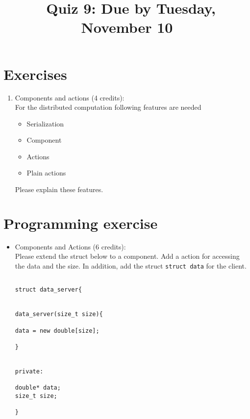 \documentclass[11pt]{article}
\begin{document}
\title{\coursename~Quiz 9: Due by Tuesday, November 10}
\date{}
\maketitle

\medskip


\section*{Exercises}

\begin{enumerate}
\item Components and actions (4 credits): \\
For the distributed computation following features are needed
\begin{itemize}
\item Serialization
\item Component
\item Actions 
\item Plain actions
\end{itemize}
Please explain these features.

\end{enumerate}


\section*{Programming exercise}

\begin{itemize}
\item Components and Actions (6 credits): \\
Please extend the struct below to a component. Add a action for accessing the data and the size. In addition, add the struct \lstinline|struct data| for the client.
\begin{lstlisting}

struct data_server{


data_server(size_t size){

data = new double[size];

}


private:

double* data;
size_t size;

}
\end{lstlisting}

\end{itemize}


\doclicenseThis 
\end{document}
